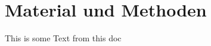 \documentclass[../main.tex]{subfiles} %
\begin{document}
\section{Material und Methoden}

This is some Text from this doc
\end{document}

